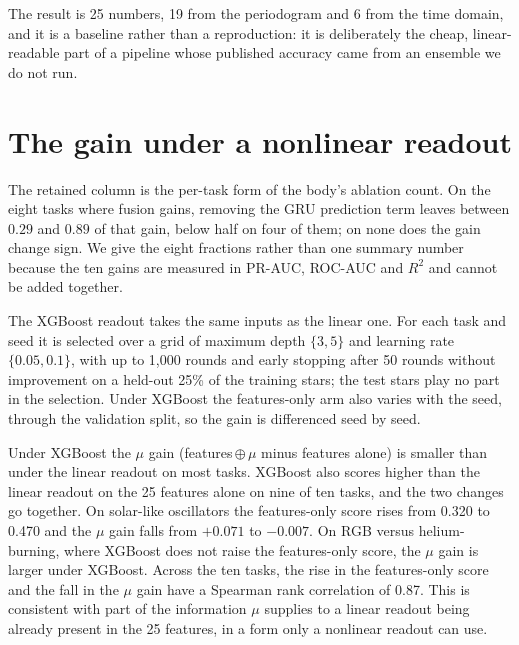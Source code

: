 \documentclass{article}
\begin{document}
The result is 25 numbers, 19 from the periodogram and 6 from the time domain, and it is a baseline
rather than a reproduction: it is deliberately the cheap, linear-readable part of a pipeline whose
published accuracy came from an ensemble we do not run.

\section{The gain under a nonlinear readout}
\label{app:readout}

\begin{table}[H]
\caption{What 128 added columns change, relative to the 25 features alone, under each frozen readout
(mean over six encoder seeds; absolute scores are in Table~\ref{tab:scorecard}). $+\mu$: our encoder.
No prediction term: the same recipe trained without the GRU prediction term. Retained: the share of
the full $\mu$ gain that survives that removal, printed only where the full gain is a gain, and
negative where the gain changes sign rather than shrinking. Untrained: a randomly
initialised encoder, which is a single encoder and carries no band. Bold: beyond $2\,\mathrm{SE}$ ---
unlike Table~\ref{tab:scorecard}, where bold marks the best point estimate and implies no test. The
last row counts tasks won, tied and lost at that bar.}
\label{tab:readout}
\centering
\scriptsize

\end{table}

The retained column is the per-task form of the body's ablation count. On the eight tasks where
fusion gains, removing the GRU prediction term leaves between $0.29$ and $0.89$ of that gain, below
half on four of them; on none does the gain change sign. We give the eight fractions rather
than one summary number because the ten gains are measured in PR-AUC, ROC-AUC and $R^{2}$ and cannot
be added together.

The XGBoost readout takes the same inputs as the linear one. For each task and seed it is selected
over a grid of maximum depth $\{3,5\}$ and learning rate $\{0.05,0.1\}$, with up to 1{,}000 rounds
and early stopping after 50 rounds without improvement on a held-out 25\% of the training stars;
the test stars play no part in the selection. Under XGBoost the features-only arm also varies with
the seed, through the validation split, so the gain is differenced seed by seed.

Under XGBoost the $\mu$ gain (features\,$\oplus\,\mu$ minus features alone) is smaller than under the
linear readout on most tasks. XGBoost also scores higher than the linear readout on the 25 features
alone on nine of ten tasks, and the two changes go together. On solar-like oscillators the features-only score rises from
0.320 to 0.470 and the $\mu$ gain falls from $+0.071$ to $-0.007$. On RGB versus helium-burning,
where XGBoost does not raise the features-only score, the $\mu$ gain is larger under XGBoost. Across
the ten tasks, the rise in the features-only score and the fall in the $\mu$ gain have a Spearman rank
correlation of 0.87. This is consistent with part of the information $\mu$ supplies to a linear
readout being already present in the 25 features, in a form only a nonlinear readout can use.
\end{document}
